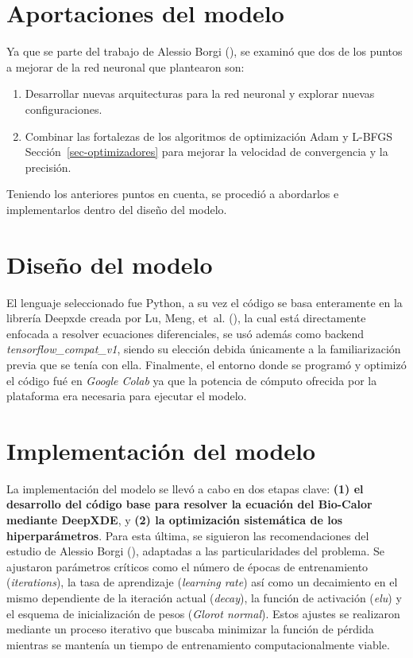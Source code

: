 \documentclass[
  spanish,
  us-letterpaper,
]{scrreprt}
\providecommand{\tightlist}{%
  \setlength{\itemsep}{0pt}\setlength{\parskip}{0pt}}
\theoremstyle{definition}
\theoremstyle{plain}
\theoremstyle{remark}
\begin{document}
\section{Aportaciones del modelo}\label{aportaciones-del-modelo}

Ya que se parte del trabajo de Alessio Borgi
(), se examinó que dos de los puntos a
mejorar de la red neuronal que plantearon son:

\begin{enumerate}
\def\labelenumi{\arabic{enumi}.}
\tightlist
\item
  Desarrollar nuevas arquitecturas para la red neuronal y explorar
  nuevas configuraciones.
\item
  Combinar las fortalezas de los algoritmos de optimización Adam y
  L-BFGS Sección~\ref{sec-optimizadores} para mejorar la velocidad de
  convergencia y la precisión.
\end{enumerate}

Teniendo los anteriores puntos en cuenta, se procedió a abordarlos e
implementarlos dentro del diseño del modelo.

\section{Diseño del modelo}\label{diseuxf1o-del-modelo}

El lenguaje seleccionado fue Python, a su vez el código se basa
enteramente en la librería Deepxde creada por Lu, Meng, et~al.
(), la cual está directamente enfocada a
resolver ecuaciones diferenciales, se usó además como backend
\emph{tensorflow\_compat\_v1}, siendo su elección debida únicamente a la
familiarización previa que se tenía con ella. Finalmente, el entorno
donde se programó y optimizó el código fué en \emph{Google Colab} ya que
la potencia de cómputo ofrecida por la plataforma era necesaria para
ejecutar el modelo.

\section{Implementación del modelo}\label{implementaciuxf3n-del-modelo}

La implementación del modelo se llevó a cabo en dos etapas clave:
\textbf{(1) el desarrollo del código base para resolver la ecuación del
Bio-Calor mediante DeepXDE}, y \textbf{(2) la optimización sistemática
de los hiperparámetros}. Para esta última, se siguieron las
recomendaciones del estudio de Alessio Borgi
(), adaptadas a las particularidades del
problema. Se ajustaron parámetros críticos como el número de épocas de
entrenamiento (\emph{iterations}), la tasa de aprendizaje
(\emph{learning rate}) así como un decaimiento en el mismo dependiente
de la iteración actual (\emph{decay}), la función de activación
(\emph{elu}) y el esquema de inicialización de pesos (\emph{Glorot
normal}). Estos ajustes se realizaron mediante un proceso iterativo que
buscaba minimizar la función de pérdida mientras se mantenía un tiempo
de entrenamiento computacionalmente viable.
\end{document}

